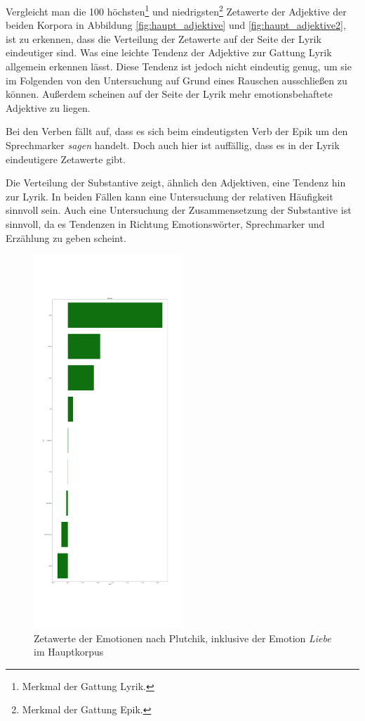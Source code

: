 \documentclass[a4paper,10p]{article}
\begin{document}
Vergleicht man die 100 höchsten\footnote{Merkmal der Gattung Lyrik.} und niedrigsten\footnote{Merkmal der Gattung Epik.} Zetawerte der Adjektive der beiden Korpora in Abbildung \ref{fig:haupt_adjektive} und \ref{fig:haupt_adjektive2}, ist zu erkennen, dass die Verteilung der Zetawerte auf der Seite der Lyrik eindeutiger sind. Was eine leichte Tendenz der Adjektive zur Gattung Lyrik allgemein erkennen lässt. Diese Tendenz ist jedoch nicht eindeutig genug, um sie im Folgenden von den Untersuchung auf Grund eines Rauschen ausschließen zu können. Außerdem scheinen auf der Seite der Lyrik mehr emotionsbehaftete Adjektive zu liegen. \par 
\newpage

Bei den Verben fällt auf, dass es sich beim eindeutigsten Verb der Epik um den Sprechmarker \textit{sagen} handelt. Doch auch hier ist auffällig, dass es in der Lyrik eindeutigere Zetawerte gibt.  \par 

Die Verteilung der Substantive zeigt, ähnlich den Adjektiven, eine Tendenz hin zur Lyrik. In beiden Fällen kann eine Untersuchung der relativen Häufigkeit sinnvoll sein. Auch eine Untersuchung der Zusammensetzung der Substantive ist sinnvoll, da es Tendenzen in Richtung Emotionswörter, Sprechmarker und Erzählung zu geben scheint.\par 

\begin{figure}
	\includegraphics[width=0.5\textwidth]{haupt_plutchik_pro_wort.png}
	\caption{Zetawerte der Emotionen nach Plutchik, inklusive der Emotion \textit{Liebe} im Hauptkorpus}
	\label{fig:haupt_plutchik}
\end{figure}
\end{document}
